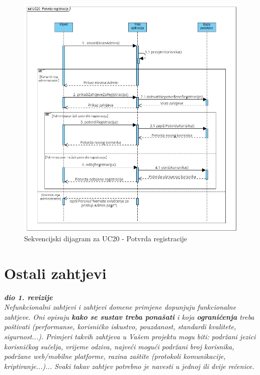                 \begin{figure}[H] \includegraphics[width=\linewidth]{./dijagrami/PotvrdaRegistracije.jpg}
				    \caption{Sekvencijski dijagram za UC20 - Potvrda registracije}
				    \end{figure}
            \eject
	
		\section{Ostali zahtjevi}
		
			\textbf{\textit{dio 1. revizije}}\\
		 
			 \textit{Nefunkcionalni zahtjevi i zahtjevi domene primjene dopunjuju funkcionalne zahtjeve. Oni opisuju \textbf{kako se sustav treba ponašati} i koja \textbf{ograničenja} treba poštivati (performanse, korisničko iskustvo, pouzdanost, standardi kvalitete, sigurnost...). Primjeri takvih zahtjeva u Vašem projektu mogu biti: podržani jezici korisničkog sučelja, vrijeme odziva, najveći mogući podržani broj korisnika, podržane web/mobilne platforme, razina zaštite (protokoli komunikacije, kriptiranje...)... Svaki takav zahtjev potrebno je navesti u jednoj ili dvije rečenice.}
			 
			 
			 
	